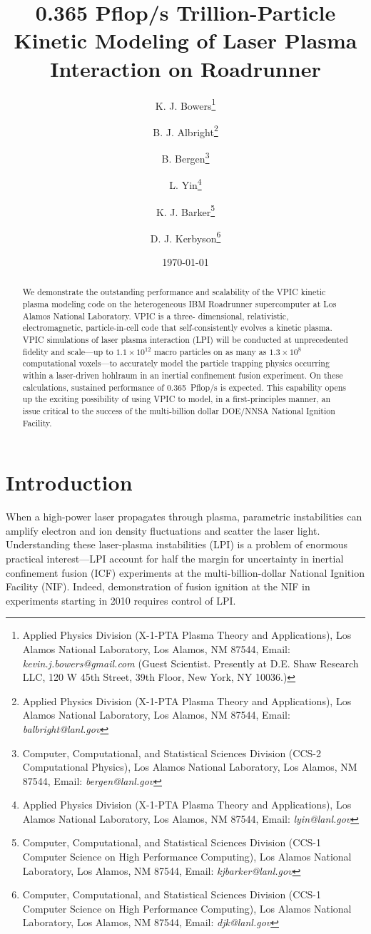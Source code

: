\documentclass[letter,10pt]{article}
\title{0.365 Pflop/s Trillion-Particle Kinetic Modeling of Laser Plasma Interaction on Roadrunner}
\author{%
K. J. Bowers\thanks{Applied Physics Division (X-1-PTA Plasma Theory and Applications), Los Alamos National Laboratory, Los Alamos, NM 87544, Email: \emph{kevin.j.bowers@gmail.com} (Guest Scientist. Presently at D.E. Shaw Research LLC, 120 W 45th Street, 39th Floor, New York, NY 10036.)} \and%
%
B. J. Albright\thanks{Applied Physics Division (X-1-PTA Plasma Theory and Applications), Los Alamos National Laboratory, Los Alamos, NM 87544, Email: \emph{balbright@lanl.gov}} \and%
%
B. Bergen\thanks{Computer, Computational, and Statistical Sciences Division (CCS-2 Computational Physics), Los Alamos National Laboratory, Los Alamos, NM 87544, Email: \emph{bergen@lanl.gov}} \and%
%
L. Yin\thanks{Applied Physics Division (X-1-PTA Plasma Theory and Applications), Los Alamos National Laboratory, Los Alamos, NM 87544, Email: \emph{lyin@lanl.gov}} \and%
%
K. J. Barker\thanks{Computer, Computational, and Statistical Sciences Division (CCS-1 Computer Science on High Performance Computing), Los Alamos National Laboratory, Los Alamos, NM 87544, Email: \emph{kjbarker@lanl.gov}} \and%
%
D. J. Kerbyson\thanks{Computer, Computational, and Statistical Sciences Division (CCS-1 Computer Science on High Performance Computing), Los Alamos National Laboratory, Los Alamos, NM 87544, Email: \emph{djk@lanl.gov}}
}
\date{\today}
\begin{document}
\maketitle
\thispagestyle{empty}

\begin{singlespace}
\begin{abstract}
We demonstrate the outstanding performance and scalability of the VPIC 
kinetic plasma modeling code on the heterogeneous IBM Roadrunner 
supercomputer at Los Alamos National Laboratory.  VPIC is a three-
dimensional, relativistic, electromagnetic, particle-in-cell code that 
self-consistently evolves a kinetic plasma.  VPIC simulations of laser 
plasma interaction (LPI) will be conducted at unprecedented fidelity 
and scale---up to $1.1 \times 10^{12}$ macro particles on as many as 
$1.3 \times 10^8$ 
computational voxels---to accurately model the particle trapping physics 
occurring within a laser-driven hohlraum in an inertial confinement 
fusion experiment.  On these calculations, sustained performance of 
0.365~Pflop/s is expected. 
This capability opens up the exciting possibility of using 
VPIC to model, in a first-principles manner, an issue critical
to the success of the multi-billion dollar DOE/NNSA National Ignition Facility.  

\vspace{2in}

\end{abstract}
\end{singlespace}

\pagebreak

\section{Introduction}

When a high-power laser propagates through plasma, parametric
instabilities can amplify electron and ion density fluctuations and
scatter the laser light.  Understanding these laser-plasma
instabilities (LPI) is a problem of enormous practical interest---LPI
account for half the margin for uncertainty in inertial confinement
fusion (ICF) experiments at the multi-billion-dollar National Ignition
Facility (NIF).  Indeed, demonstration of fusion ignition at the NIF
in experiments starting in 2010 requires control of LPI.
\end{document}
